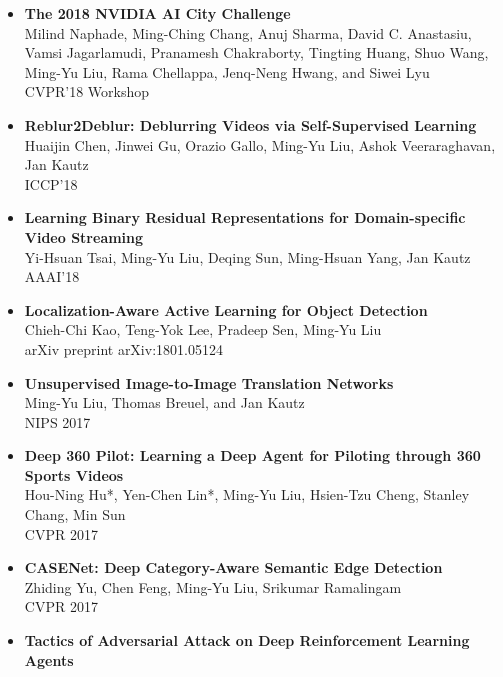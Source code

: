 \begin{itemize}
\item {\bf The 2018 NVIDIA AI City Challenge}\\
       Milind Naphade, Ming-Ching Chang, Anuj Sharma, David C. Anastasiu, Vamsi Jagarlamudi, Pranamesh Chakraborty, Tingting Huang, Shuo Wang, Ming-Yu Liu, Rama Chellappa, Jenq-Neng Hwang, and Siwei Lyu\\
       CVPR'18 Workshop \vspace{-2mm}
\item {\bf Reblur2Deblur: Deblurring Videos via Self-Supervised Learning}\\
       Huaijin Chen, Jinwei Gu, Orazio Gallo, Ming-Yu Liu, Ashok Veeraraghavan, Jan Kautz\\
       ICCP'18 \vspace{-2mm}       
\item {\bf Learning Binary Residual Representations for Domain-specific Video Streaming}\\
	   Yi-Hsuan Tsai, Ming-Yu Liu, Deqing Sun, Ming-Hsuan Yang, Jan Kautz\\
	   AAAI'18 \vspace{-2mm}
\item {\bf Localization-Aware Active Learning for Object Detection}\\
	   Chieh-Chi Kao, Teng-Yok Lee, Pradeep Sen, Ming-Yu Liu\\
       arXiv preprint arXiv:1801.05124	\vspace{-2mm}	
\item {\bf Unsupervised Image-to-Image Translation Networks}\\
	   Ming-Yu Liu, Thomas Breuel, and Jan Kautz\\
	   NIPS 2017\vspace{-2mm}
\item {\bf Deep 360 Pilot: Learning a Deep Agent for Piloting through 360 Sports Videos}\\
      Hou-Ning Hu*, Yen-Chen Lin*, Ming-Yu Liu, Hsien-Tzu Cheng, Stanley Chang, Min Sun\\
      CVPR 2017\vspace{-2mm}
\item {\bf CASENet: Deep Category-Aware Semantic Edge Detection}\\
      Zhiding Yu, Chen Feng, Ming-Yu Liu, Srikumar Ramalingam\\
      CVPR 2017\vspace{-2mm}
\item {\bf Tactics of Adversarial Attack on Deep Reinforcement Learning Agents}\\

\end{itemize}
